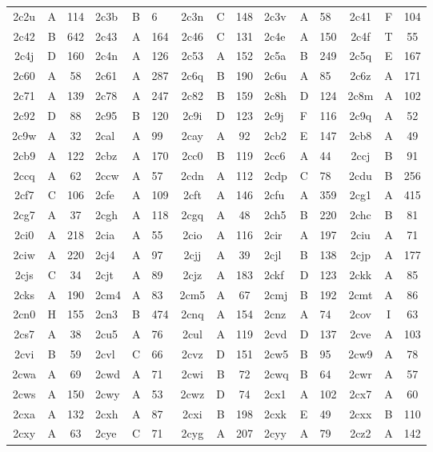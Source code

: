\begin{longtable}{|c|c|c| a|a|a| c|c|c| a|a|a| c|c|c|}
2c2u & A & 114 & 2c3b & B & 6 & 2c3n & C & 148 & 2c3v & A & 58 & 2c41 & F & 104\\
2c42 & B & 642 & 2c43 & A & 164 & 2c46 & C & 131 & 2c4e & A & 150 & 2c4f & T & 55\\
2c4j & D & 160 & 2c4n & A & 126 & 2c53 & A & 152 & 2c5a & B & 249 & 2c5q & E & 167\\
2c60 & A & 58 & 2c61 & A & 287 & 2c6q & B & 190 & 2c6u & A & 85 & 2c6z & A & 171\\
2c71 & A & 139 & 2c78 & A & 247 & 2c82 & B & 159 & 2c8h & D & 124 & 2c8m & A & 102\\
2c92 & D & 88 & 2c95 & B & 120 & 2c9i & D & 123 & 2c9j & F & 116 & 2c9q & A & 52\\
2c9w & A & 32 & 2cal & A & 99 & 2cay & A & 92 & 2cb2 & E & 147 & 2cb8 & A & 49\\
2cb9 & A & 122 & 2cbz & A & 170 & 2cc0 & B & 119 & 2cc6 & A & 44 & 2ccj & B & 91\\
2ccq & A & 62 & 2ccw & A & 57 & 2cdn & A & 112 & 2cdp & C & 78 & 2cdu & B & 256\\
2cf7 & C & 106 & 2cfe & A & 109 & 2cft & A & 146 & 2cfu & A & 359 & 2cg1 & A & 415\\
2cg7 & A & 37 & 2cgh & A & 118 & 2cgq & A & 48 & 2ch5 & B & 220 & 2chc & B & 81\\
2ci0 & A & 218 & 2cia & A & 55 & 2cio & A & 116 & 2cir & A & 197 & 2ciu & A & 71\\
2ciw & A & 220 & 2cj4 & A & 97 & 2cjj & A & 39 & 2cjl & B & 138 & 2cjp & A & 177\\
2cjs & C & 34 & 2cjt & A & 89 & 2cjz & A & 183 & 2ckf & D & 123 & 2ckk & A & 85\\
2cks & A & 190 & 2cm4 & A & 83 & 2cm5 & A & 67 & 2cmj & B & 192 & 2cmt & A & 86\\
2cn0 & H & 155 & 2cn3 & B & 474 & 2cnq & A & 154 & 2cnz & A & 74 & 2cov & I & 63\\
2cs7 & A & 38 & 2cu5 & A & 76 & 2cul & A & 119 & 2cvd & D & 137 & 2cve & A & 103\\
2cvi & B & 59 & 2cvl & C & 66 & 2cvz & D & 151 & 2cw5 & B & 95 & 2cw9 & A & 78\\
2cwa & A & 69 & 2cwd & A & 71 & 2cwi & B & 72 & 2cwq & B & 64 & 2cwr & A & 57\\
2cws & A & 150 & 2cwy & A & 53 & 2cwz & D & 74 & 2cx1 & A & 102 & 2cx7 & A & 60\\
2cxa & A & 132 & 2cxh & A & 87 & 2cxi & B & 198 & 2cxk & E & 49 & 2cxx & B & 110\\
2cxy & A & 63 & 2cye & C & 71 & 2cyg & A & 207 & 2cyy & A & 79 & 2cz2 & A & 142\\

\end{longtable}
